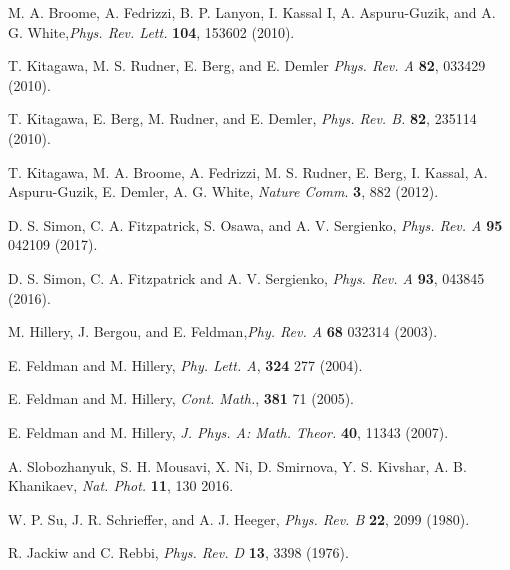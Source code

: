 \documentclass[twocolumn,amsmath, amssymb, superscriptaddress, pra]{revtex4}
\begin{document}
\begin{thebibliography}{99}
 M. A. Broome, A. Fedrizzi, B. P. Lanyon, I. Kassal I, A.
    Aspuru-Guzik, and A. G. White,\emph{Phys. Rev. Lett.} \textbf{104},
    153602  (2010).


 T. Kitagawa, M. S. Rudner, E. Berg, and  E. Demler \emph{Phys.
    Rev. A} \textbf{82}, 033429 (2010).

 T. Kitagawa, E. Berg, M. Rudner, and E. Demler,  %
\emph{Phys. Rev. B.} \textbf{82}, 235114 (2010).

  T. Kitagawa, M. A. Broome, A. Fedrizzi,  M. S. Rudner, E. Berg,  I. Kassal,  A. Aspuru-Guzik,  E. Demler, A. G. White,  \emph{Nature
    Comm}. {\bf 3}, 882 (2012).

 D. S. Simon, C. A. Fitzpatrick, S. Osawa, and A. V. Sergienko,
    \emph{Phys. Rev. A} \textbf{95} 042109 (2017).

D. S. Simon, C. A. Fitzpatrick and A. V. Sergienko,  \emph{Phys. Rev.  A}
\textbf{93}, 043845 (2016).

 M. Hillery, J. Bergou, and E. Feldman,\emph{Phy. Rev. A}
    \textbf{68} 032314  (2003).

 E. Feldman and M. Hillery,  \emph{Phy. Lett. A}, \textbf{324}
    277 (2004).

 E. Feldman and M. Hillery, \emph{Cont. Math.}, \textbf{381} 71  (2005). %

 E. Feldman and M. Hillery, \emph{J. Phys. A: Math. Theor.}
    \textbf{40}, 11343 (2007).

 A. Slobozhanyuk, S. H. Mousavi, X. Ni, D. Smirnova, Y. S.
    Kivshar, A. B. Khanikaev, \emph{Nat. Phot.} \textbf{11}, 130 2016.
%
%


 W. P. Su, J. R.  Schrieffer, and A. J. Heeger, \emph{Phys. Rev.
    B} \textbf{22}, 2099 (1980).

 R. Jackiw and C. Rebbi,   %
\emph{Phys. Rev. D} \textbf{13}, 3398 (1976).


\end{thebibliography}
\end{document}

